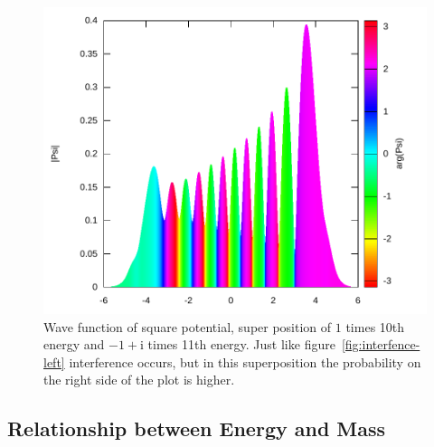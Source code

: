 \documentclass[11pt,DIV=10,final]{scrreprt} %
\newcommand{\mi}{{\text{i}}}
\begin{document}
\begin{figure}[H]
\centering
\includegraphics[width=\textwidth]{plots/super-square-10_1-11_-1+i.pdf}
\caption{\label{fig:interference-right} Wave function of square potential, super position of $1$ times 10th energy and $-1+\mi$ times 11th energy. Just like figure~\ref{fig:interfence-left}
    interference occurs, but in this superposition the probability on the right side of the plot is higher.}
\end{figure}

\subsection{Relationship between Energy and Mass}
\end{document}
